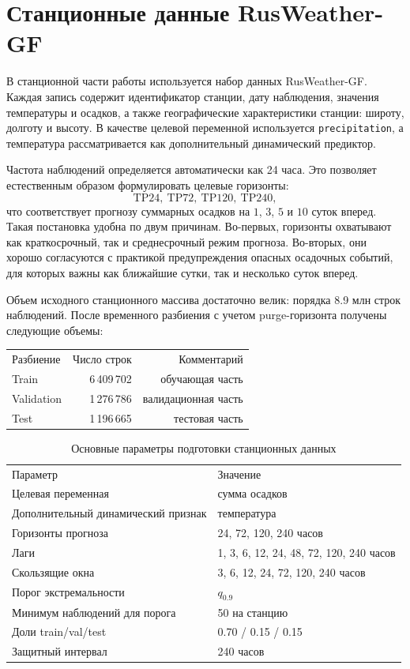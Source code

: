 \section{Станционные данные RusWeather-GF}

В станционной части работы используется набор данных RusWeather-GF. Каждая запись содержит идентификатор станции, дату наблюдения, значения температуры и осадков, а также географические характеристики станции: широту, долготу и высоту. В качестве целевой переменной используется \texttt{precipitation}, а температура рассматривается как дополнительный динамический предиктор.

Частота наблюдений определяется автоматически как 24 часа. Это позволяет естественным образом формулировать целевые горизонты:
\[
\text{TP24},\ \text{TP72},\ \text{TP120},\ \text{TP240},
\]
что соответствует прогнозу суммарных осадков на \(1\), \(3\), \(5\) и \(10\) суток вперед. Такая постановка удобна по двум причинам. Во-первых, горизонты охватывают как краткосрочный, так и среднесрочный режим прогноза. Во-вторых, они хорошо согласуются с практикой предупреждения опасных осадочных событий, для которых важны как ближайшие сутки, так и несколько суток вперед.

Объем исходного станционного массива достаточно велик: порядка 8.9 млн строк наблюдений. После временного разбиения с учетом purge-горизонта получены следующие объемы:
\begin{center}
\begin{tabular}{lrr}
Разбиение & Число строк & Комментарий \\
Train & 6\,409\,702 & обучающая часть \\
Validation & 1\,276\,786 & валидационная часть \\
Test & 1\,196\,665 & тестовая часть \\
\end{tabular}
\end{center}

\begin{table}[H]
\centering
\begin{tabular}{p{}p{}}
Параметр & Значение \\
Целевая переменная & сумма осадков \\
Дополнительный динамический признак & температура \\
Горизонты прогноза & 24, 72, 120, 240 часов \\
Лаги & 1, 3, 6, 12, 24, 48, 72, 120, 240 часов \\
Скользящие окна & 3, 6, 12, 24, 72, 120, 240 часов \\
Порог экстремальности & \(q_{0.9}\) \\
Минимум наблюдений для порога & 50 на станцию \\
Доли train/val/test & 0.70 / 0.15 / 0.15 \\
Защитный интервал & 240 часов \\
\end{tabular}
\caption{Основные параметры подготовки станционных данных}
\label{tab:cfg-station-main}
\end{table}

